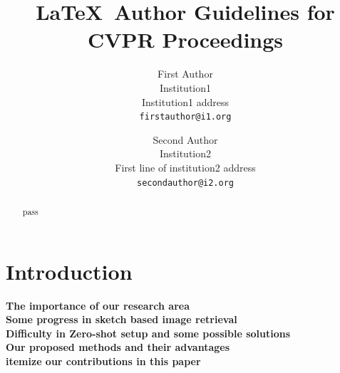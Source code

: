 \documentclass[10pt,twocolumn,letterpaper]{article}
\begin{document}
\title{\LaTeX\ Author Guidelines for CVPR Proceedings}

\author{First Author\\
Institution1\\
Institution1 address\\
{\tt\small firstauthor@i1.org}
\and
Second Author\\
Institution2\\
First line of institution2 address\\
{\tt\small secondauthor@i2.org}
}

\maketitle

\maketitle

\begin{abstract}
   pass
\end{abstract}

\section{Introduction}

\textbf{The importance of our research area} \\

\textbf{Some progress in sketch based image retrieval} \\

\textbf{Difficulty in Zero-shot setup and some possible solutions} \\

\textbf{Our proposed methods and their advantages} \\

\textbf{itemize our contributions in this paper} \\




\end{document}
